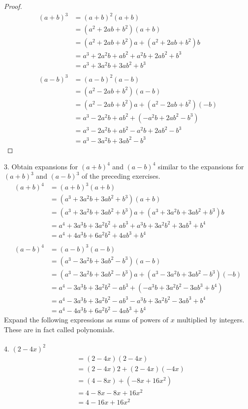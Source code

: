 \documentclass[12pt]{article}
\begin{document}
\begin{proof}
\begin{align*}
(a+b)^3&=(a+b)^2(a+b) \\
&=(a^2+2ab+b^2)(a+b) \\
&=(a^2+2ab+b^2)a+(a^2+2ab+b^2)b \\
&=a^3+2a^2b+ab^2+a^2b+2ab^2+b^3 \\
&=a^3+3a^2b+3ab^2+b^3 \\
\\
(a-b)^3&=(a-b)^2(a-b) \\
&=(a^2-2ab+b^2)(a-b) \\
&=(a^2-2ab+b^2)a+(a^2-2ab+b^2)(-b) \\
&=a^3-2a^2b+ab^2+(-a^2b+2ab^2-b^3) \\
&=a^3-2a^2b+ab^2-a^2b+2ab^2-b^3 \\
&=a^3-3a^2b+3ab^2-b^3
\end{align*}
\end{proof}
3. Obtain expansions for $(a+b)^4$ and $(a-b)^4$ similar to the expansions for $(a+b)^3$ and $(a-b)^3$ of the preceding exercises.
\begin{align*}
(a+b)^4&=(a+b)^3(a+b) \\
&=(a^3+3a^2b+3ab^2+b^3)(a+b) \\
&=(a^3+3a^2b+3ab^2+b^3)a+(a^3+3a^2b+3ab^2+b^3)b \\
&=a^4+3a^3b+3a^2b^2+ab^3+a^3b+3a^2b^2+3ab^3+b^4 \\
&=a^4+4a^3b+6a^2b^2+4ab^3+b^4 \\
\\
(a-b)^4&=(a-b)^3(a-b) \\
&=(a^3-3a^2b+3ab^2-b^3)(a-b) \\
&=(a^3-3a^2b+3ab^2-b^3)a+(a^3-3a^2b+3ab^2-b^3)(-b) \\
&=a^4-3a^3b+3a^2b^2-ab^3+(-a^3b+3a^2b^2-3ab^3+b^4) \\
&=a^4-3a^3b+3a^2b^2-ab^3-a^3b+3a^2b^2-3ab^3+b^4 \\
&=a^4-4a^3b+6a^2b^2-4ab^3+b^4
\end{align*}
Expand the following expressions as sums of powers of $x$ multiplied by integers. These are in fact called polynomials. \\
\\
4. $(2-4x)^2$
\begin{align*}
&=(2-4x)(2-4x) \\
&=(2-4x)2+(2-4x)(-4x) \\
&=(4-8x)+(-8x+16x^2) \\
&=4-8x-8x+16x^2 \\
&=4-16x+16x^2
\end{align*}
\end{document}
